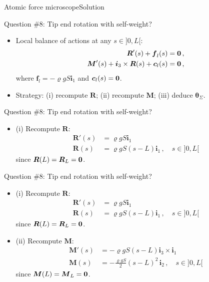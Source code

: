 \documentclass{beamer}
\newcommand{\cj}{c}
\newcommand{\cv}{{\boldsymbol\cj}}
\renewcommand{\ij}{i}
\newcommand{\iv}{{\boldsymbol\ij}}
\newcommand*{\drotj}{\theta}
\newcommand*{\drot}{{\boldsymbol\drotj}}
\newcommand{\fj}{f}
\newcommand{\fv}{{\boldsymbol\fj}}
\newcommand{\roi}{\varrho}
\newcommand{\Fresj}{R}
\newcommand{\Mresj}{M}
\newcommand{\Fres}{{\boldsymbol\Fresj}}
\newcommand{\Mres}{{\boldsymbol\Mresj}}
\newcommand{\bzero}{{\bf 0}}
\begin{document}
\begin{frame}{Atomic force microscope}{Solution}

\begin{overprint}

\vskip-30pt
\begin{exampleblock}{Question \#8: Tip end rotation with self-weight?}
\begin{itemize}
\item Local balance of actions at any $s\in]0,L[$:
\begin{displaymath}
\begin{split}
\Fres'(s)+\fv_l(s) &=\bzero\,, \\
\Mres'(s)+\iv_3\times\Fres(s)+\cv_l(s) &=\bzero\,,
\end{split}
\end{displaymath}
where $\fv_l=-\roi gS\iv_1$ and $\cv_l(s)=\bzero$.
\item Strategy: (i) recompute $\Fres$; (ii) recompute $\Mres$; (iii) deduce $\drot_\Sigma$.
\end{itemize}
\end{exampleblock}

\vskip-30pt
\begin{exampleblock}{Question \#8: Tip end rotation with self-weight?}
\begin{itemize}
\item (i) Recompute $\Fres$:
\begin{displaymath}
\begin{split}
\Fres'(s) &=\roi g S\iv_1 \\
\Fres(s) & =\roi g S(s-L)\iv_1\,,\quad s\in]0,L[
\end{split}
\end{displaymath}
since $\Fres(L)=\Fres_L=\bzero$.
\end{itemize}
\end{exampleblock}

\vskip-30pt
\begin{exampleblock}{Question \#8: Tip end rotation with self-weight?}
\begin{itemize}
\item (i) Recompute $\Fres$:
\begin{displaymath}
\begin{split}
\Fres'(s) &=\roi g S\iv_1 \\
\Fres(s) & =\roi g S(s-L)\iv_1\,,\quad s\in]0,L[
\end{split}
\end{displaymath}
since $\Fres(L)=\Fres_L=\bzero$.
\item (ii) Recompute $\Mres$:
\begin{displaymath}
\begin{split}
\Mres'(s) &=-\roi g S(s-L)\iv_3\times\iv_1 \\
\Mres(s) & =-\frac{\roi g S}{2}(s-L)^2\,\iv_2\,,\quad s\in]0,L[
\end{split}
\end{displaymath}
since $\Mres(L)=\Mres_L=\bzero$.
\end{itemize}
\end{exampleblock}


\end{overprint}
\end{frame}
\end{document}
